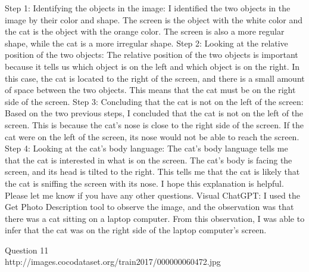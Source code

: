 \begin{enumerate}
        Step 1: Identifying the objects in the image: I identified the two objects in the image by their color and shape. The screen is the object with the white color and the cat is the object with the orange color. The screen is also a more regular shape, while the cat is a more irregular shape.
        Step 2: Looking at the relative position of the two objects: The relative position of the two objects is important because it tells us which object is on the left and which object is on the right. In this case, the cat is located to the right of the screen, and there is a small amount of space between the two objects. This means that the cat must be on the right side of the screen.
        Step 3: Concluding that the cat is not on the left of the screen: Based on the two previous steps, I concluded that the cat is not on the left of the screen. This is because the cat's nose is close to the right side of the screen. If the cat were on the left of the screen, its nose would not be able to reach the screen.
        Step 4: Looking at the cat's body language: The cat's body language tells me that the cat is interested in what is on the screen. The cat's body is facing the screen, and its head is tilted to the right. This tells me that the cat is likely that the cat is sniffing the screen with its nose.
        I hope this explanation is helpful. Please let me know if you have any other questions.
        \subitem Visual ChatGPT: I used the Get Photo Description tool to observe the image, and the observation was that there was a cat sitting on a laptop computer. From this observation, I was able to infer that the cat was on the right side of the laptop computer's screen.
    \end{enumerate}
Question 11\\
http://images.cocodataset.org/train2017/000000060472.jpg
